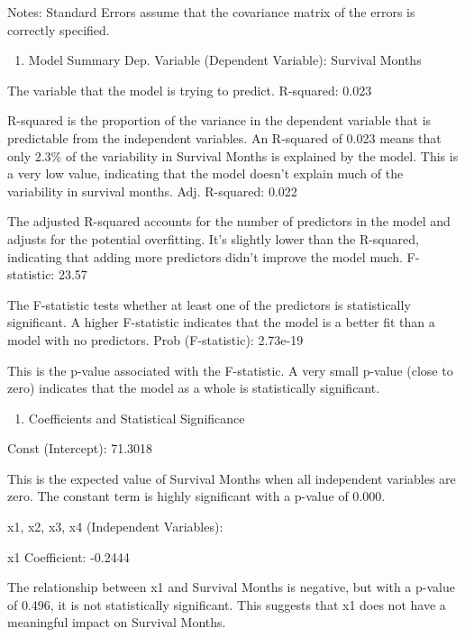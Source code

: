 \documentclass[11pt]{article}
\providecommand{\tightlist}{%
      \setlength{\itemsep}{0pt}\setlength{\parskip}{0pt}}
\begin{document}
Notes: \newline
 [1] Standard Errors assume that the covariance matrix of the errors is correctly specified.

    

    \begin{enumerate}
\def\labelenumi{\arabic{enumi}.}
\tightlist
\item
  Model Summary Dep. Variable (Dependent Variable): Survival Months
\end{enumerate}

The variable that the model is trying to predict. R-squared: 0.023

R-squared is the proportion of the variance in the dependent variable
that is predictable from the independent variables. An R-squared of
0.023 means that only 2.3\% of the variability in Survival Months is
explained by the model. This is a very low value, indicating that the
model doesn't explain much of the variability in survival months. Adj.
R-squared: 0.022

The adjusted R-squared accounts for the number of predictors in the
model and adjusts for the potential overfitting. It's slightly lower
than the R-squared, indicating that adding more predictors didn't
improve the model much. F-statistic: 23.57

The F-statistic tests whether at least one of the predictors is
statistically significant. A higher F-statistic indicates that the model
is a better fit than a model with no predictors. Prob (F-statistic):
2.73e-19

This is the p-value associated with the F-statistic. A very small
p-value (close to zero) indicates that the model as a whole is
statistically significant.

\begin{enumerate}
\def\labelenumi{\arabic{enumi}.}
\setcounter{enumi}{1}
\tightlist
\item
  Coefficients and Statistical Significance
\end{enumerate}

Const (Intercept): 71.3018

This is the expected value of Survival Months when all independent
variables are zero. The constant term is highly significant with a
p-value of 0.000.

x1, x2, x3, x4 (Independent Variables):

x1 Coefficient: -0.2444

The relationship between x1 and Survival Months is negative, but with a
p-value of 0.496, it is not statistically significant. This suggests
that x1 does not have a meaningful impact on Survival Months.
\end{document}
